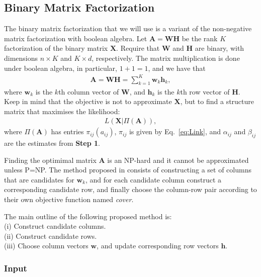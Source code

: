 \documentclass[12pt]{article}
\begin{document}
\subsection{Binary Matrix Factorization} %

The binary matrix factorization that we will use is a variant of the non-negative matrix factorization with boolean algebra. 
Let $\mathbf{A} = \mathbf{WH}$ be the rank $K$ factorization of the binary matrix $\mathbf{X}$.
Require that $\mathbf{W}$ and $\mathbf{H}$ are binary, with dimensions $n \times K$ and $K \times d$, respectively. 
The matrix multiplication is done under boolean algebra, in particular, $1 + 1 = 1$, and we have that
\begin{align}
  \mathbf{A} = \mathbf{WH} = \sum_{k = 1}^K \mathbf{w}_k \mathbf{h}_k,
\end{align}
where $\mathbf{w}_k$ is the $k$th column vector of $\mathbf{W}$, and $\mathbf{h}_k$ is the $k$th row vector of $\mathbf{H}$.
Keep in mind that the objective is not to approximate $\mathbf{X}$, but to find a structure matrix that maximises the likelihood:
\begin{align}
  L(\mathbf{X}| \Pi(\mathbf{A})),
\end{align}
where $\Pi(\mathbf{A})$ has entries $\pi_{ij}(a_{ij})$, $\pi_{ij}$ is given by Eq.~\ref{eq:Link}, and $\alpha_{ij}$ and $\beta_{ij}$ are the estimates from {\bf Step 1}.

Finding the optimimal matrix $\mathbf{A}$ is an NP-hard and it cannot be approximated unless P=NP\cite{Miettinen2008Discrete}.
The method proposed in \cite{Miettinen2008Discrete} consists of constructing a set of columns that are candidates for $\mathbf{w}_k$, and for each candidate column construct a corresponding candidate row, and finally choose the column-row pair according to their own objective function named {\it cover}. 

The main outline of the following proposed method is: \\
(i) Construct candidate columns. \\
(ii) Construct candidate rows. \\
(iii) Choose column vectors $\mathbf{w}$, and update corresponding row vectors $\mathbf{h}$. 

\subsubsection{Input} %
\end{document}

